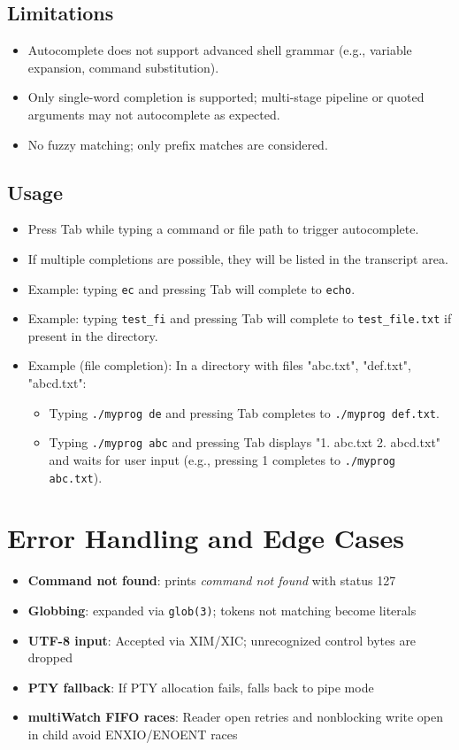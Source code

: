 \documentclass[11pt,a4paper]{article}
\begin{document}
\subsection{Limitations}
\begin{itemize}[leftmargin=*]
  \item Autocomplete does not support advanced shell grammar (e.g., variable expansion, command substitution).
  \item Only single-word completion is supported; multi-stage pipeline or quoted arguments may not autocomplete as expected.
  \item No fuzzy matching; only prefix matches are considered.
\end{itemize}

\subsection{Usage}
\begin{itemize}[leftmargin=*]
  \item Press Tab while typing a command or file path to trigger autocomplete.
  \item If multiple completions are possible, they will be listed in the transcript area.
  \item Example: typing \texttt{ec} and pressing Tab will complete to \texttt{echo}.
  \item Example: typing \texttt{test\_fi} and pressing Tab will complete to \texttt{test\_file.txt} if present in the directory.
  \item Example (file completion): In a directory with files "abc.txt", "def.txt", "abcd.txt":
    \begin{itemize}
      \item Typing \texttt{./myprog de} and pressing Tab completes to \texttt{./myprog def.txt}.
      \item Typing \texttt{./myprog abc} and pressing Tab displays "1. abc.txt 2. abcd.txt" and waits for user input (e.g., pressing 1 completes to \texttt{./myprog abc.txt}).
    \end{itemize}
\end{itemize}

\section{Error Handling and Edge Cases}
\begin{itemize}[leftmargin=*]
  \item \textbf{Command not found}: prints \emph{command not found} with status 127
  \item \textbf{Globbing}: expanded via \texttt{glob(3)}; tokens not matching become literals
  \item \textbf{UTF-8 input}: Accepted via XIM/XIC; unrecognized control bytes are dropped
  \item \textbf{PTY fallback}: If PTY allocation fails, falls back to pipe mode
  \item \textbf{multiWatch FIFO races}: Reader open retries and nonblocking write open in child avoid ENXIO/ENOENT races
\end{itemize}
\end{document}
